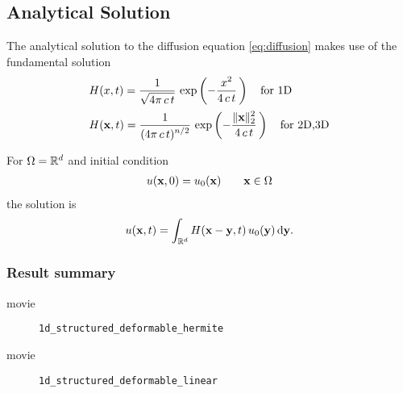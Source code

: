 \subsection{Analytical Solution}
The analytical solution to the diffusion equation \eqref{eq:diffusion} makes use of the fundamental solution
\begin{equation*}
  \begin{array}{lll}
    H(x,t) = \displaystyle\frac{\displaystyle{1}}{\displaystyle{\sqrt{4\pi\,c\,t}}}\,\exp\left(-\displaystyle\frac{\displaystyle{x^2}}{\displaystyle{4\,c\,t}}\,\right) \quad \text{for 1D}\\[4mm]
    H(\textbf{x},t) = \displaystyle\frac{\displaystyle{1}}{\displaystyle{(4\pi\,c\,t)^{n/2}}}\,\exp\left(-\displaystyle\frac{\displaystyle{\Vert \textbf{x}\Vert_2^2}}{\displaystyle{4\,c\,t}}\,\right) \quad \text{for 2D,3D}\\[4mm]
  \end{array}
\end{equation*}
For $\Omega=\mathbb{R}^d$ and initial condition
\begin{equation*}
  \begin{array}{lll}
    u(\textbf{x},0) = u_0(\textbf{x})\qquad \textbf{x} \in \Omega
  \end{array}
\end{equation*}
the solution is
\begin{equation*}
  \begin{array}{lll}
    u(\bfx,t) = \ds\int_{\R^d} H(\bfx - \bfy,t)\,u_0(\bfy)\,\d \bfy.
  \end{array}
\end{equation*}

\subsubsection{Result summary}
%
%
\begin{frame}{movie}
  \begin{figure}[h!]
    \centering    
    \caption{\lstinline{1d_structured_deformable_hermite}}
  \end{figure} 
\end{frame}



%
\begin{frame}{movie}
  \begin{figure}[h!]
    \centering    
    \caption{\lstinline{1d_structured_deformable_linear}}
  \end{figure} 
\end{frame}

